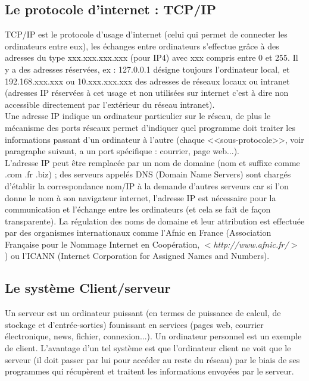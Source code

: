 \documentclass[11pt,twoside,a4paper]{article}
\begin{document}
	\subsection{Le protocole d'internet : TCP/IP}
			
			TCP/IP est le protocole d'usage d'internet (celui qui permet de connecter les ordinateurs entre eux), les {\'e}changes entre ordinateurs s'effectue gr{\^a}ce {\`a} des adresses du type xxx.xxx.xxx.xxx (pour IP4) avec xxx compris entre 0 et 255. Il y a des adresses r{\'e}serv{\'e}es, ex : 127.0.0.1 d{\'e}signe toujours l'ordinateur local, et 192.168.xxx.xxx ou 10.xxx.xxx.xxx des adresses de r{\'e}seaux locaux ou intranet (adresses IP r{\'e}serv{\'e}es {\`a} cet usage et non utilis{\'e}es sur internet c'est {\`a} dire non accessible directement par l'ext{\'e}rieur du r{\'e}seau intranet).~\\

			Une adresse IP indique un ordinateur particulier sur le r{\'e}seau, de plus le m{\'e}canisme des ports r{\'e}seaux permet d'indiquer quel programme doit traiter les informations passant d'un ordinateur {\`a} l'autre (chaque <<sous-protocole>>, voir paragraphe suivant, a un port sp{\'e}cifique : courrier, page web...). ~\\

			L'adresse IP peut {\^e}tre remplac{\'e}e par un nom de domaine (nom et suffixe comme .com .fr .biz) ; des serveurs appel{\'e}s DNS (Domain Name Servers) sont charg{\'e}s d'{\'e}tablir la correspondance nom/IP {\`a} la demande d'autres serveurs car si l'on donne le nom {\`a} son navigateur internet, l'adresse IP est n{\'e}cessaire pour la communication et l'{\'e}change entre les ordinateurs (et cela se fait de fa\c{c}on transparente). La r{\'e}gulation des noms de domaine et leur attribution est effectu{\'e}e par des organismes internationaux comme l'Afnic en France (Association Fran\c{c}aise pour le Nommage Internet en Coop{\'e}ration, $<$\emph{http://www.afnic.fr/}$>$ ) ou l'ICANN (Internet Corporation for Assigned Names and Numbers).

	\subsection{Le syst{\`e}me Client/serveur}

			Un serveur est un ordinateur puissant (en termes de puissance de calcul, de stockage et d'entr{\'e}e-sorties) founissant en services (pages web, courrier {\'e}lectronique, news, fichier, connexion...). Un ordinateur personnel est un exemple de client. L'avantage d'un tel syst{\`e}me est que l'ordinateur client ne voit que le serveur (il doit passer par lui pour acc{\'e}der au reste du r{\'e}seau) par le biais de ses programmes qui r{\'e}cup{\`e}rent et traitent les informations envoy{\'e}es par le serveur. ~\\
\end{document}
